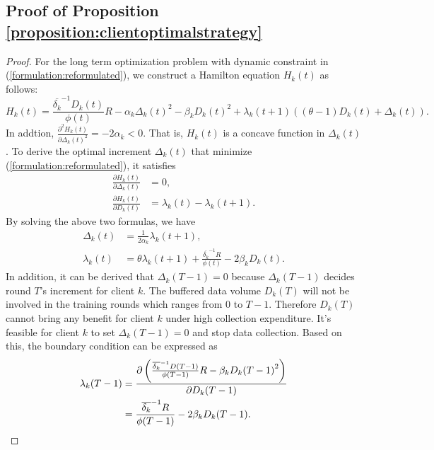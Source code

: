 \documentclass{article}
\theoremstyle{plain}
\theoremstyle{definition}
\theoremstyle{remark}
\begin{document}
\subsection{Proof of Proposition \ref{proposition:clientoptimalstrategy}}
\begin{proof}
    \label{proof:clientoptimalstrategy}
    For the long term optimization problem with dynamic constraint in (\ref{formulation:reformulated}), we construct a Hamilton equation $H_k(t)$ as follows:
    \begin{equation}
      H_k(t) = \frac{\overline{\delta_k}^{-1}D_k(t)}{\phi(t)}R - \alpha_k {\Delta_k(t)}^2 - \beta_k {D_k(t)^2} + \lambda_k(t+1)\left((\theta-1) D_k(t) + \Delta_k(t)\right).
    \end{equation}
    In addtion, $\frac{\partial^2 H_k(t)}{\partial {\Delta_k(t)}^2} = -2\alpha_k < 0$. That is, $H_k(t)$ is a concave function in $\Delta_k(t)$.
    To derive the optimal increment $\Delta_k(t)$ that minimize (\ref{formulation:reformulated}), it satisfies 
    \begin{align}
      \frac{\partial H_k(t)}{\partial \Delta_k(t)} & = 0, \\
      \frac{\partial H_k(t)}{\partial D_k(t)} & = \lambda_k(t) - \lambda_k(t+1).
    \end{align}
    By solving the above two formulas, we have
    \begin{align}
      \label{formulation:proof_delta}
      \Delta_k(t) & = \frac{1}{2\alpha_k} \lambda_k(t+1), \\
      \label{formulation:proof_lambda}
      \lambda_k(t) & = \theta \lambda_k(t+1) + \frac{\overline{\delta_k}^{-1}R}{\phi(t)} - 2\beta_k D_k(t).
    \end{align}  
    In addition, it can be derived that $\Delta_k(T-1) = 0$ because $\Delta_k(T-1)$ decides round $T$'s increment for client $k$.
    The buffered data volume $D_k(T)$ will not be involved in the training rounds which ranges from 0 to $T-1$.
    Therefore $D_k(T)$ cannot bring any benefit for client $k$ under high collection expenditure.
    It's feasible for client $k$ to set $\Delta_k(T-1) = 0$ and stop data collection.
    Based on this, the boundary condition can be expressed as
    \begin{align}
      \label{formulation:boundary}
      \lambda_k(T-1) & = \frac{\partial \left(\frac{\overline{\delta_k}^{-1}D(T-1)}{\phi(T-1)} R - \beta_k{D_k(T-1)}^2 \right)}{\partial D_k(T-1)} \notag \\
                     & = \frac{\overline{\delta_k}^{-1}R}{\phi(T-1)}- 2\beta_k D_k(T-1).

\end{align}
\end{proof}
\end{document}
